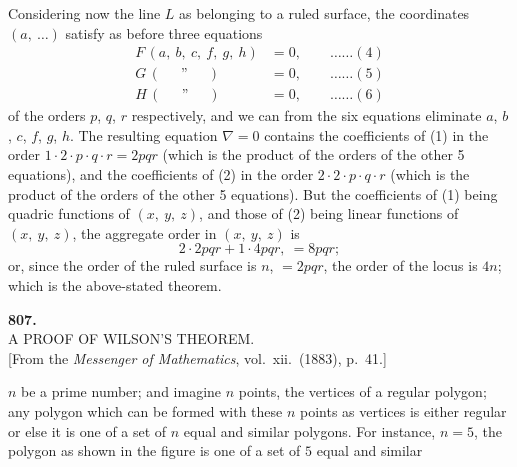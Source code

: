 \documentclass[11pt,a4paper]{article}
\providecommand{\textsc}[1]{{\scshape #1}}
\begin{document}
\medskip
Considering now the line $L$ as belonging to a ruled surface, the coordinates $(a,\ \ldots)$ satisfy as before three equations
\[
\begin{aligned}
F\,(a,\ b,\ c,\ f,\ g,\ h) &= 0,\qquad\ldots\ldots(4)\\
G\,(\;\quad\,\text{''}\;\quad\,) &= 0,\qquad\ldots\ldots(5)\\
H\,(\;\quad\,\text{''}\;\quad\,) &= 0,\qquad\ldots\ldots(6)
\end{aligned}
\]
of the orders $p$, $q$, $r$ respectively, and we can from the six equations eliminate $a$, $b$, $c$, $f$, $g$, $h$.  The resulting equation $\nabla = 0$ contains the coefficients of (1) in the order $1\cdot 2\cdot p\cdot q\cdot r = 2pqr$ (which is the product of the orders of the other 5 equations), and the coefficients of (2) in the order $2\cdot 2\cdot p\cdot q\cdot r$ (which is the product of the orders of the other 5 equations). But the coefficients of (1) being quadric functions of $(x,\ y,\ z)$, and those of (2) being linear functions of $(x,\ y,\ z)$, the aggregate order in $(x,\ y,\ z)$ is
\[
2\cdot 2pqr + 1\cdot 4pqr,\ = 8pqr;
\]
or, since the order of the ruled surface is $n$, $= 2pqr$, the order of the locus is $4n$; which is the above-stated theorem.
\clearpage

\fancyhead[L]{\small 807]}
\fancyhead[C]{\small\ }

\thispagestyle{plain}
\begin{center}
\vspace*{2em}
{\Large\bfseries 807.}\\[1.5em]
{\normalsize\scshape A PROOF OF WILSON'S THEOREM.}\\[1em]
{\small [From the \textit{Messenger of Mathematics}, vol.~xii.\ (1883), p.~41.]}
\end{center}

\medskip
\noindent \textsc{Let} $n$ be a prime number; and imagine $n$ points, the vertices of a regular polygon; any polygon which can be formed with these $n$ points as vertices is either regular or else it is one of a set of $n$ equal and similar polygons.  For instance, $n = 5$, the polygon as shown in the figure is one of a set of $5$ equal and similar

\begin{center}
\end{center}
\end{document}
